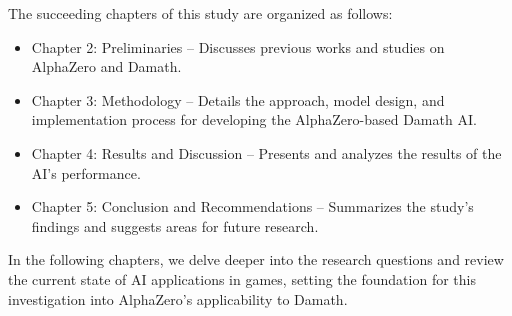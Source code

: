 The succeeding chapters of this study are organized as follows:
\begin{itemize}
    \item Chapter 2: Preliminaries – Discusses previous works and studies on AlphaZero and Damath.
    \item Chapter 3: Methodology – Details the approach, model design, and implementation process for developing the AlphaZero-based Damath AI.
    \item Chapter 4: Results and Discussion – Presents and analyzes the results of the AI’s performance.
    \item Chapter 5: Conclusion and Recommendations – Summarizes the study’s findings and suggests areas for future research.
\end{itemize}

In the following chapters, we delve deeper into the research questions and review the current state of AI applications in games, setting the foundation for this investigation into AlphaZero’s applicability to Damath.